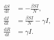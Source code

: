 \documentclass[oneside,a4paper,12pt]{article}
\begin{document}
\begin{align*}
  \frac{\mathrm{d}S}{\mathrm{d}t} &= -\frac{\beta S I}{N},\\
  \frac{\mathrm{d}I}{\mathrm{d}t} &= \frac{\beta S I}{N} - \gamma I,\\
  \frac{\mathrm{d}R}{\mathrm{d}t} &= \gamma I.
  \end{align*}
\end{document}
